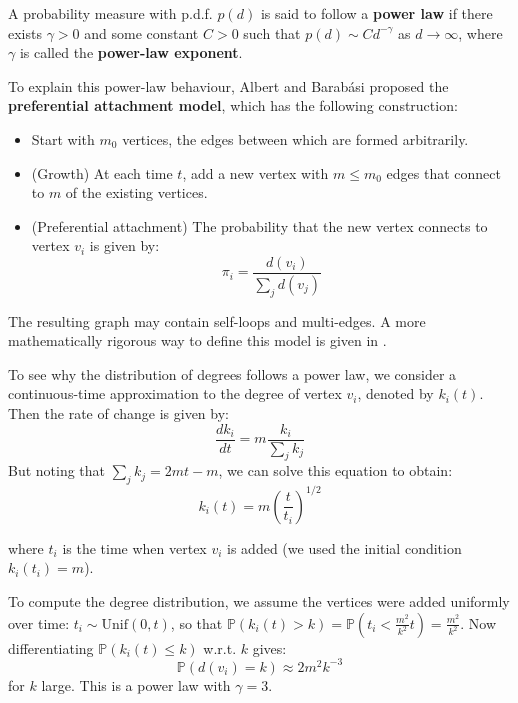 \documentclass{article}
\begin{document}
\begin{definition}
    A probability measure with p.d.f. $p(d)$ is said to follow a \textbf{power law} if there exists $\gamma>0$ and some constant $C>0$ such that $p(d)\sim C d^{-\gamma}$ as $d\to \infty$, where $\gamma$ is called the \textbf{power-law exponent}.
\end{definition}

To explain this power-law behaviour, Albert and Barab\'{a}si proposed the \textbf{preferential attachment model}, which has the following construction:
\begin{itemize}
    \item Start with $m_0$ vertices, the edges between which are formed arbitrarily.  
    \item (Growth) At each time $t$, add a new vertex with $m\leq m_0$ edges that connect to $m$ of the existing vertices.
    \item (Preferential attachment) The probability that the new vertex connects to vertex $v_i$ is given by:
    \begin{equation*}
        \pi_i = \frac{d(v_i)}{\sum_j d(v_j)}
    \end{equation*}
\end{itemize}

The resulting graph may contain self-loops and multi-edges. A more mathematically rigorous way to define this model is given in \citep{barabasi2016network}.  

\begin{unexaminable}
    To see why the distribution of degrees follows a power law, we consider a continuous-time approximation to the degree of vertex $v_i$, denoted by $k_i(t)$. Then the rate of change is given by:
    \begin{equation*}
        \frac{d k_i}{dt} = m \frac{k_i}{\sum_j k_j}
    \end{equation*}
    But noting that $\sum_j k_j = 2mt - m$, we can solve this equation  to obtain:
    \begin{equation*}
        k_i(t) = m \left( \frac{t}{t_i} \right)^{1/2}
    \end{equation*}

    where $t_i$ is the time when vertex $v_i$ is added (we used the initial condition $k_i(t_i)=m$).

    To compute the degree distribution, we assume the vertices were added uniformly over time: $t_i \sim \mathrm{Unif}(0,t)$, so that
     $\mathbb{P}(k_i(t)>k) = \mathbb{P}(t_i < \frac{m^2}{k^2} t) = \frac{m^2}{k^2}$.
     Now differentiating $\mathbb{P}(k_i(t)\leq k)$ w.r.t. $k$ gives:  
    \begin{equation*}
        \mathbb{P}(d(v_i)=k) \approx 2m^2 k^{-3}
    \end{equation*}
    for $k$ large. This is a power law with $\gamma=3$.
\end{unexaminable}
\end{document}
